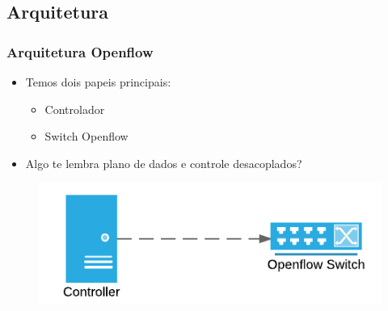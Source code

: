 \subsection{Arquitetura}

%
%
\begin{frame}\frametitle{Arquitetura Openflow}

    \begin{itemize}
    \item Temos dois papeis principais:
        \begin{itemize}
        \item Controlador
        \item Switch Openflow
        \end{itemize}
    \item Algo te lembra plano de dados e controle desacoplados?
    \end{itemize}
    
	\begin{figure}[h]
        \centering
        \includegraphics[scale=0.6]{images/controller-to-openflow.png}
    \end{figure}
\end{frame}



